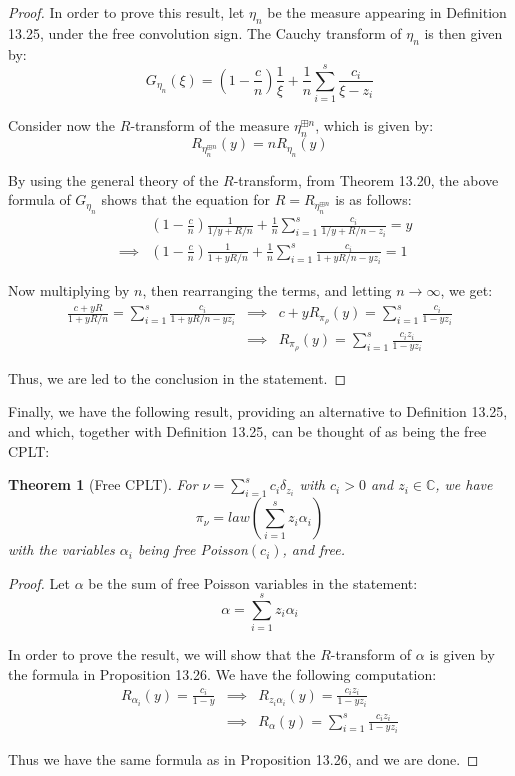 \documentclass[12pt]{amsbook}
\newtheorem{theorem}{Theorem}[chapter]
\begin{document}
\begin{proof}
In order to prove this result, let $\eta_n$ be the measure appearing in Definition 13.25, under the free convolution sign. The Cauchy transform of $\eta_n$ is then given by:
$$G_{\eta_n}(\xi)=\left(1-\frac{c}{n}\right)\frac{1}{\xi}+\frac{1}{n}\sum_{i=1}^s\frac{c_i}{\xi-z_i}$$

Consider now the $R$-transform of the measure $\eta_n^{\boxplus n}$, which is given by:
$$R_{\eta_n^{\boxplus n}}(y)=nR_{\eta_n}(y)$$

By using the general theory of the $R$-transform, from Theorem 13.20, the above formula of $G_{\eta_n}$ shows that the equation for $R=R_{\eta_n^{\boxplus n}}$ is as follows:
\begin{eqnarray*}
&&\left(1-\frac{c}{n}\right)\frac{1}{1/y+R/n}+\frac{1}{n}\sum_{i=1}^s\frac{c_i}{1/y+R/n-z_i}=y\\
&\implies&\left(1-\frac{c}{n}\right)\frac{1}{1+yR/n}+\frac{1}{n}\sum_{i=1}^s\frac{c_i}{1+yR/n-yz_i}=1
\end{eqnarray*}

Now multiplying by $n$, then rearranging the terms, and letting $n\to\infty$, we get:
\begin{eqnarray*}
\frac{c+yR}{1+yR/n}=\sum_{i=1}^s\frac{c_i}{1+yR/n-yz_i}
&\implies&c+yR_{\pi_\rho}(y)=\sum_{i=1}^s\frac{c_i}{1-yz_i}\\
&\implies&R_{\pi_\rho}(y)=\sum_{i=1}^s\frac{c_iz_i}{1-yz_i}
\end{eqnarray*}

Thus, we are led to the conclusion in the statement.
\end{proof}

Finally, we have the following result, providing an alternative to Definition 13.25, and which, together with Definition 13.25, can be thought of as being the free CPLT:


\begin{theorem}[Free CPLT]
For $\nu=\sum_{i=1}^sc_i\delta_{z_i}$ with $c_i>0$ and $z_i\in\mathbb C$, we have
$$\pi_\nu=law\left(\sum_{i=1}^sz_i\alpha_i\right)$$
with the variables $\alpha_i$ being free Poisson$(c_i)$, and free.
\end{theorem}

\begin{proof}
Let $\alpha$ be the sum of free Poisson variables in the statement:
$$\alpha=\sum_{i=1}^sz_i\alpha_i$$

In order to prove the result, we will show that the $R$-transform of $\alpha$ is given by the formula in Proposition 13.26. We have the following computation:
\begin{eqnarray*}
R_{\alpha_i}(y)=\frac{c_i}{1-y}
&\implies&R_{z_i\alpha_i}(y)=\frac{c_iz_i}{1-yz_i}\\
&\implies&R_\alpha(y)=\sum_{i=1}^s\frac{c_iz_i}{1-yz_i}
\end{eqnarray*}

Thus we have the same formula as in Proposition 13.26, and we are done.
\end{proof}
\end{document}
